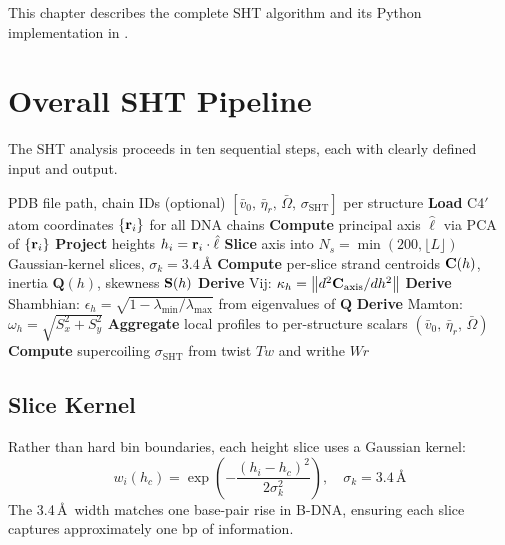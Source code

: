 

This chapter describes the complete SHT algorithm and its Python implementation in .

\section{Overall SHT Pipeline}

The SHT analysis proceeds in ten sequential steps, each with clearly defined input and output.

\begin{algorithm}[H]
\caption{SHT Geometric Analysis of a DNA Structure}\label{alg:sht_main}
\begin{algorithmic}[1]
\Require PDB file path, chain IDs (optional)
\Ensure $[\bar{v}_0,\,\bar{\eta}_r,\,\bar{\Omega},\,\sigma_{\mathrm{SHT}}]$ per structure
\State \textbf{Load} C4$'$ atom coordinates $\{\mathbf{r}_i\}$ for all DNA chains
\State \textbf{Compute} principal axis $\hat{\ell}$ via PCA of $\{\mathbf{r}_i\}$
\State \textbf{Project} heights $h_i = \mathbf{r}_i \cdot \hat{\ell}$
\State \textbf{Slice} axis into $N_s = \min(200, \lfloor L \rfloor)$ Gaussian-kernel slices, $\sigma_k = 3.4$\,\AA
\State \textbf{Compute} per-slice strand centroids $\mathbf{C}(h)$, inertia $\mathbf{Q}(h)$, skewness $\mathbf{S}(h)$
\State \textbf{Derive} Vij: $\kappa_h = \left\lVert d^2\mathbf{C}_{\mathrm{axis}}/dh^2\right\rVert$
\State \textbf{Derive} Shambhian: $\epsilon_h = \sqrt{1 - \lambda_{\min}/\lambda_{\max}}$ from eigenvalues of $\mathbf{Q}$
\State \textbf{Derive} Mamton: $\omega_h = \sqrt{S_x^2 + S_y^2}$
\State \textbf{Aggregate} local profiles to per-structure scalars $(\bar{v}_0,\,\bar{\eta}_r,\,\bar{\Omega})$
\State \textbf{Compute} supercoiling $\sigma_{\mathrm{SHT}}$ from twist $Tw$ and writhe $Wr$
\end{algorithmic}
\end{algorithm}

\subsection{Slice Kernel}

Rather than hard bin boundaries, each height slice uses a Gaussian kernel:
\begin{equation}
    w_i(h_c) = \exp\!\left(-\frac{(h_i - h_c)^2}{2\sigma_k^2}\right), \quad \sigma_k = 3.4\,\text{\AA}
\end{equation}
The 3.4\,\AA\ width matches one base-pair rise in B-DNA, ensuring each slice captures approximately one bp of information.

